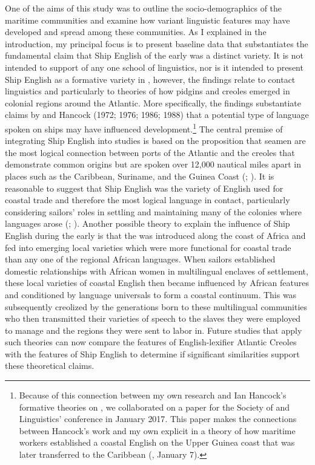One of the aims of this study was to outline the socio-demographics of the maritime communities and examine how variant linguistic features may have developed and spread among these communities. As I explained in the introduction, my principal focus is to present baseline data that substantiates the fundamental claim that Ship English of the early  was a distinct variety. It is not intended to support of any one school of  linguistics, nor is it intended to present Ship English as a formative variety in , however, the findings relate to contact linguistics and particularly to theories of how pidgins and creoles emerged in colonial regions around the Atlantic. More specifically, the findings substantiate claims by \citet{Reinecke1938} and Hancock (1972; 1976; 1986; 1988) that a potential type of language spoken on ships may have influenced  development.\footnote{Because of this connection between my own research and Ian Hancock’s formative theories on , we collaborated on a paper for the Society of  and  Linguistics’ conference in January {2017}. This paper makes the connections between Hancock’s work and my own explicit in a theory of how maritime workers established a coastal English on the Upper Guinea coast that was later transferred to the Caribbean (\citealt{DelgadoHancock2017}, January 7).} The central premise of integrating Ship English into  studies is based on the proposition that seamen are the most logical connection between ports of the Atlantic and the creoles that demonstrate common origins but are spoken over 12,000 nautical miles apart in places such as the Caribbean, Suriname, and the Guinea Coast (\citealt{Hancock1976}; \citealt{FaraclasEtAl2012}). It is reasonable to suggest that Ship English was the variety of English used for coastal trade and therefore the most logical language in contact, particularly considering sailors’ roles in settling and maintaining many of the colonies where  languages arose (\citealt{BaileyRoss1988}; \citealt{Holm1988}). Another possible theory to explain the influence of Ship English during the early  is that the  was introduced along the coast of Africa and fed into emerging local varieties which were more functional for coastal trade than any one of the regional African languages. When sailors established domestic relationships with African women in multilingual enclaves of settlement, these local varieties of coastal English then became influenced by African features and conditioned by language universals to form a coastal  continuum. This  was subsequently creolized by the generations born to these multilingual communities who then transmitted their varieties of speech to the slaves they were employed to manage and the regions they were sent to labor in. Future studies that apply such theories can now compare the features of English-lexifier Atlantic Creoles with the features of Ship English to determine if significant similarities support these theoretical claims. 

